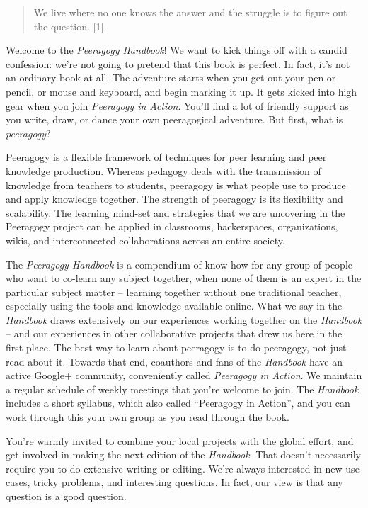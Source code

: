 \begin{quote}
We live where no one knows the answer and the struggle is to figure out
the question. {{[}1{]}}
\end{quote}

Welcome to the \emph{Peeragogy Handbook}! We want to kick things off
with a candid confession: we're not going to pretend that this book is
perfect. In fact, it's not an ordinary book at all. The adventure starts
when you get out your pen or pencil, or mouse and keyboard, and begin
marking it up. It gets kicked into high gear when you join
\emph{Peeragogy in Action}. You'll find a lot of friendly support as you
write, draw, or dance your own peeragogical adventure. But first, what
is \emph{peeragogy}?

Peeragogy is a flexible framework of techniques for peer learning and
peer knowledge production. Whereas pedagogy deals with the transmission
of knowledge from teachers to students, peeragogy is what people use to
produce and apply knowledge together. The strength of peeragogy is its
flexibility and scalability. The learning mind-set and strategies that
we are uncovering in the Peeragogy project can be applied in classrooms,
hackerspaces, organizations, wikis, and interconnected collaborations
across an entire society.

The \emph{Peeragogy Handbook} is a compendium of know how for any group
of people who want to co-learn any subject together, when none of them
is an expert in the particular subject matter -- learning together
without one traditional teacher, especially using the tools and
knowledge available online. What we say in the \emph{Handbook} draws
extensively on our experiences working together on the \emph{Handbook}
-- and our experiences in other collaborative projects that drew us here
in the first place. The best way to learn about peeragogy is to do
peeragogy, not just read about it. Towards that end, coauthors and fans
of the \emph{Handbook} have an active Google+ community, conveniently
called \emph{Peeragogy in Action}. We maintain a regular schedule of
weekly meetings that you're welcome to join. The \emph{Handbook}
includes a short syllabus, which also called ``Peeragogy in Action'',
and you can work through this your own group as you read through the
book.

You're warmly invited to combine your local projects with the global
effort, and get involved in making the next edition of the
\emph{Handbook}. That doesn't necessarily require you to do extensive
writing or editing. We're always interested in new use cases, tricky
problems, and interesting questions. In fact, our view is that any
question is a good question.

